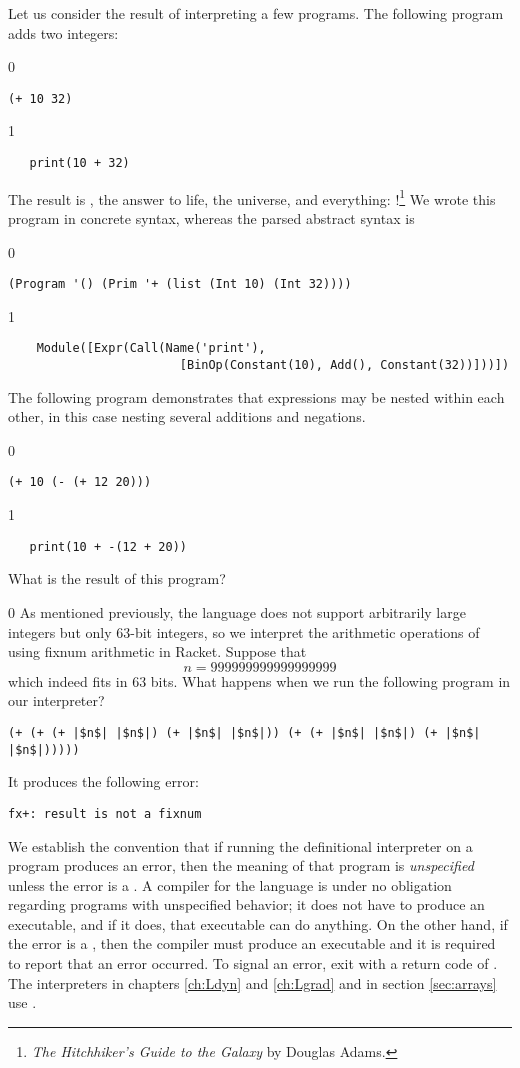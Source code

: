 \documentclass[7x10]{TimesAPriori_MIT}%
\def\racketEd{0}
\def\pythonEd{1}
\def\edition{1}
\newcommand{\pythonColor}[0]{}
\numberwithin{theorem}{chapter}
\numberwithin{definition}{chapter}
\numberwithin{equation}{chapter}
\begin{document}
Let us consider the result of interpreting a few \LangInt{} programs. The
following program adds two integers:
{\if\edition\racketEd
\begin{lstlisting}
(+ 10 32)
\end{lstlisting}
\fi}
{\if\edition\pythonEd\pythonColor
\begin{lstlisting}
   print(10 + 32)
\end{lstlisting}
\fi}
%
\noindent The result is , the answer to life, the universe,
and everything: !\footnote{\emph{The Hitchhiker's Guide to
    the Galaxy} by Douglas Adams.}
%
We wrote this program in concrete syntax, whereas the parsed
abstract syntax is
{\if\edition\racketEd
\begin{lstlisting}
(Program '() (Prim '+ (list (Int 10) (Int 32))))
\end{lstlisting}
\fi}
{\if\edition\pythonEd\pythonColor
\begin{lstlisting}
    Module([Expr(Call(Name('print'),
                        [BinOp(Constant(10), Add(), Constant(32))]))])        
\end{lstlisting}
\fi}
The following program demonstrates that expressions may be nested within
each other, in this case nesting several additions and negations.
{\if\edition\racketEd
\begin{lstlisting}
(+ 10 (- (+ 12 20)))
\end{lstlisting}
\fi}
{\if\edition\pythonEd\pythonColor
\begin{lstlisting}
   print(10 + -(12 + 20))
\end{lstlisting}
\fi}
%
\noindent What is the result of this program?

{\if\edition\racketEd
As mentioned previously, the \LangInt{} language does not support
arbitrarily large integers but only $63$-bit integers, so we
interpret the arithmetic operations of \LangInt{} using fixnum arithmetic
in Racket.
Suppose that
\[
  n = 999999999999999999
\]
which indeed fits in $63$ bits.  What happens when we run the
following program in our interpreter?
\begin{lstlisting}
(+ (+ (+ |$n$| |$n$|) (+ |$n$| |$n$|)) (+ (+ |$n$| |$n$|) (+ |$n$| |$n$|)))))
\end{lstlisting}
It produces the following error:
\begin{lstlisting}
fx+: result is not a fixnum
\end{lstlisting}
We establish the convention that if running the definitional
interpreter on a program produces an error, then the meaning of that
program is \emph{unspecified} unless the
error is a . A compiler for the language is under
no obligation regarding programs with unspecified behavior; it does
not have to produce an executable, and if it does, that executable can
do anything.  On the other hand, if the error is a
, then the compiler must produce an executable and
it is required to report that an error occurred. To signal an error,
exit with a return code of .  The interpreters in chapters
\ref{ch:Ldyn} and \ref{ch:Lgrad} and in section \ref{sec:arrays} use
.
\fi}
\end{document}
